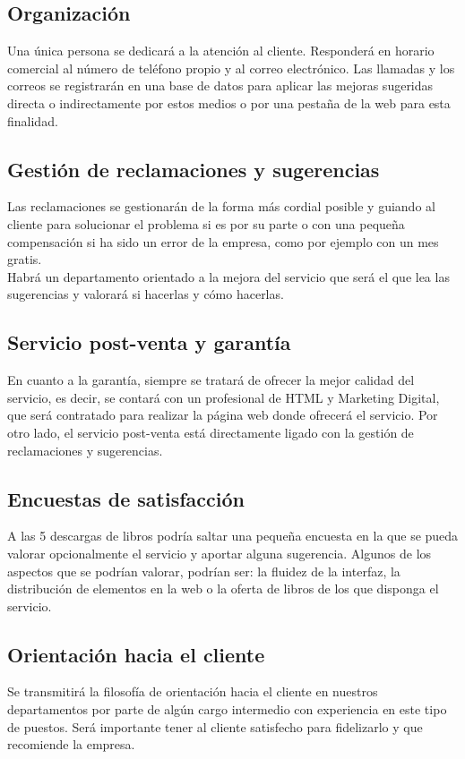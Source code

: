 \documentclass[openany,overnay,a4paper, twoside, 12pt]{book}
\begin{document}
\subsection{Organización}
Una única persona se dedicará a la atención al cliente. Responderá en horario comercial al número de teléfono propio y al correo electrónico. Las llamadas y los correos se registrarán en una base de datos para aplicar las mejoras sugeridas directa o indirectamente por estos medios o por una pestaña de la web para esta finalidad.
\subsection{Gestión de reclamaciones y sugerencias}
Las reclamaciones se gestionarán de la forma más cordial posible y guiando al cliente para solucionar el problema si es por su parte o con una pequeña compensación si ha sido un error de la empresa, como por ejemplo con un mes gratis.
\\Habrá un departamento orientado a la mejora del servicio que será el que lea las sugerencias y valorará si hacerlas y cómo hacerlas.


\subsection{Servicio post-venta y garantía}
En cuanto a la garantía, siempre se tratará de ofrecer la mejor calidad del servicio, es decir, se contará con un profesional de HTML y Marketing Digital, que será contratado para realizar la página web donde ofrecerá el servicio.
Por otro lado, el servicio post-venta está directamente ligado con la gestión de reclamaciones y sugerencias.
\subsection{Encuestas de satisfacción}
A las 5 descargas de libros podría saltar una pequeña encuesta en la que se pueda valorar opcionalmente el servicio y aportar alguna sugerencia. Algunos de los aspectos que se podrían valorar, podrían ser: la fluidez de la interfaz, la distribución de elementos en la web o la oferta de libros de los que disponga el servicio.
\subsection{Orientación hacia el cliente}
Se transmitirá la filosofía de orientación hacia el cliente en nuestros departamentos por parte de algún cargo intermedio con experiencia en este tipo de puestos. Será importante tener al cliente satisfecho para fidelizarlo y que recomiende la empresa.
\setcounter{chapter}{5} %
\end{document}

